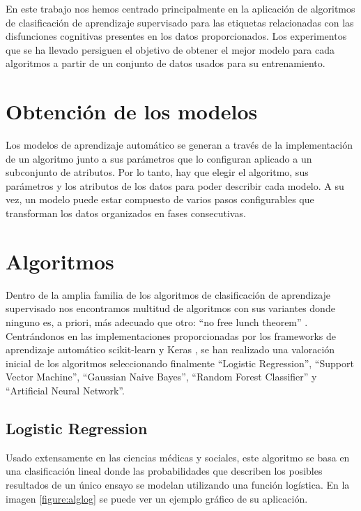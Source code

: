 En este trabajo nos hemos centrado principalmente en la aplicación de algoritmos de clasificación de aprendizaje supervisado para las etiquetas relacionadas con las disfunciones cognitivas presentes en los datos proporcionados. Los experimentos que se ha llevado persiguen el objetivo de obtener el mejor modelo para cada algoritmos a partir de un conjunto de datos usados para su entrenamiento.

\section{Obtención de los modelos}

Los modelos de aprendizaje automático se generan a través de la implementación de un algoritmo junto a sus parámetros que lo configuran aplicado a un subconjunto de atributos. Por lo tanto, hay que elegir el algoritmo, sus parámetros y los atributos de los datos para poder describir cada modelo. A su vez, un modelo puede estar compuesto de varios pasos configurables que transforman los datos organizados en fases consecutivas.

\section{Algoritmos}

Dentro de la amplia familia de los algoritmos de clasificación de aprendizaje supervisado nos encontramos multitud de algoritmos con sus variantes donde ninguno es, a priori, más adecuado que otro: ``no free lunch theorem'' \cite{Wolpert1996TheAlgorithms}. Centrándonos en las implementaciones proporcionadas por los frameworks de aprendizaje automático scikit-learn \cite{Scikit-learn:Documentation} y Keras \cite{KerasDocumentation}, se han realizado una valoración inicial de los algoritmos seleccionando finalmente ``Logistic Regression'', ``Support Vector Machine'', ``Gaussian Naive Bayes'', ``Random Forest Classifier'' y ``Artificial Neural Network''.

\subsection{Logistic Regression}
Usado extensamente en las ciencias médicas y sociales, este algoritmo se basa en una clasificación  lineal donde las probabilidades que describen los posibles resultados de un único ensayo se modelan utilizando una función logística. En la imagen \ref{figure:alglog} se puede ver un ejemplo gráfico de su aplicación.

